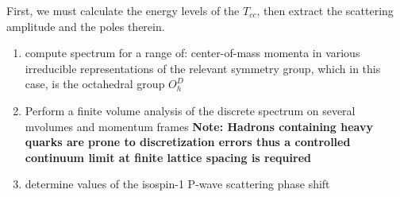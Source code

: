 First, we must calculate the energy levels of the $T_{cc}$, then extract the scattering amplitude and the poles therein. 

\begin{enumerate}
    \item compute spectrum for a range of:
    \subitem center-of-mass momenta 
    \subitem in various irreducible representations of the relevant symmetry group, which in this case, is the octahedral group $O_h^D$ 
    \item Perform a finite volume analysis of the discrete spectrum on several mvolumes and momentum frames
        \subitem \textbf{Note: Hadrons containing heavy quarks are prone to discretization errors thus a controlled continuum limit at finite lattice spacing is required} 
    \item determine values of the isospin-1 P-wave scattering phase shift 
\end{enumerate}
    